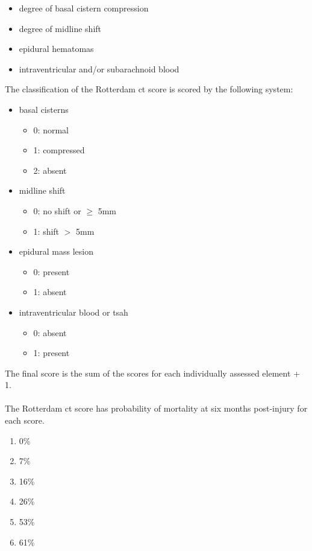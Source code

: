 \documentclass[11pt]{article}
\begin{document}
\begin{itemize}
\item{degree of basal cistern compression}
\item{degree of midline shift}
\item{epidural hematomas}
\item{intraventricular and/or subarachnoid blood}
\end{itemize}

The classification of the Rotterdam \gls{ct} score is scored by the following system:

\begin{itemize}
\item{basal cisterns}
  \begin{itemize}
    \item{0: normal}
    \item{1: compressed}
    \item{2: absent}
  \end{itemize}
\item{midline shift}
  \begin{itemize}
    \item{0: no shift or $\geq$ 5mm}
    \item{1: shift $>$ 5mm}
  \end{itemize}
\item{epidural mass lesion}
  \begin{itemize}
    \item{0: present}
    \item{1: absent}
  \end{itemize}
\item{intraventricular blood or \gls{tsah}}
  \begin{itemize}
    \item{0: absent}
    \item{1: present}
  \end{itemize}
\end{itemize}
The final score is the sum of the scores for each individually assessed element + 1.\\
\\
The Rotterdam \gls{ct} score has probability of mortality at six months post-injury for each score.\\
\begin{enumerate}
  \item{0\%}
  \item{7\%}
  \item{16\%}
  \item{26\%}
  \item{53\%}
  \item{61\%}
\end{enumerate}
\end{document}
